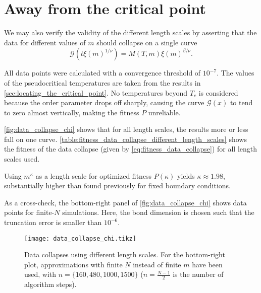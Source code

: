 \section{Away from the critical point}

We may also verify the validity of the different length scales by asserting that the data for different values of $m$
should collapse on a single curve
\begin{equation}
  \mathcal{G}(t \xi(m)^{1/\nu}) = M(T, m) \xi(m)^{\beta/\nu}.
\end{equation}

All data points were calculated with a convergence threshold of $10^{-7}$.
The values of the pseudocritical temperatures are taken from the results in \autoref{sec:locating_the_critical_point}.
No temperatures beyond $T_c$ is considered because the order parameter drops off sharply,
causing the curve $\mathcal{G}(x)$ to tend to zero almost vertically, making the fitness $P$ unreliable.

\autoref{fig:data_collapse_chi} shows that for all length scales, the results more or less fall on one curve.
\autoref{table:fitness_data_collapse_different_length_scales} shows the fitness of the data collapse
\cite{bhattacharjee2001measure} (given by \autoref{eq:fitness_data_collapse}) for all length scales used.

Using $m^{\kappa}$ as a length scale for optimized fitness $P(\kappa)$ yields $\kappa \approx 1.98$,
substantially higher than found previously for fixed boundary conditions.

As a cross-check, the bottom-right panel of \autoref{fig:data_collapse_chi} shows data points for finite-$N$
simulations. Here, the bond dimension is chosen such that the truncation error is smaller than $10^{-6}$.

\begin{figure}
  \texttt{[image: data\_collapse\_chi.tikz]}
  \caption{Data collapses using different length scales.
  For the bottom-right plot, approximations with finite $N$ instead of finite $m$ have been used,
  with $n = \{160, 480, 1000, 1500 \}$ ($n = \frac{N - 1}{2}$ is the number of algorithm
  steps).}\label{fig:data_collapse_chi}
\end{figure}

